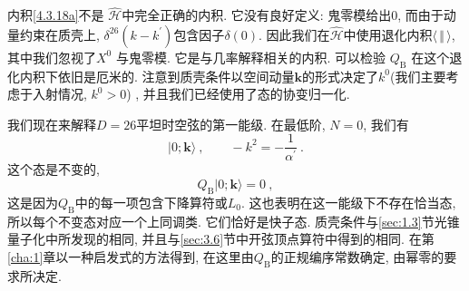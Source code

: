 内积\eqref{4.3.18a}不是 $\hat{\mathscr{H}}$中完全正确的内积. 它没有良好定义: 鬼零模给出0, 而由于动量约束在质壳上, $\delta^{26}(k-k^{\prime})$包含因子$\delta(0)$. 
因此我们在$\hat{\mathscr{H}}$中使用退化内积$\langle \,\Vert \,\rangle$, 其中我们忽视了$X^{0}$ 与鬼零模. 它是与几率解释相关的内积. 可以检验 $Q_{\mathrm{B}}$ 在这个退化内积下依旧是厄米的. 注意到质壳条件以空间动量$\mathbf{k}$的形式决定了$k^{0}$(我们主要考虑于入射情况, $k^{0}>0$) , 并且我们已经使用了态的协变归一化.

我们现在来解释$D=26$平坦时空弦的第一能级. 在最低阶, $N=0$, 我们有
\begin{equation}
|0 ; \mathbf{k}\rangle \:, \qquad-k^{2}=-\frac{1}{\alpha^{\prime}} \:. \label{4.3.23}
\end{equation}
这个态是不变的,
\begin{equation}
Q_{\mathrm{B}}|0 ; \mathbf{k}\rangle=0 \:, \label{4.3.24}
\end{equation}
这是因为$Q_{\mathrm{B}}$中的每一项包含下降算符或$L_{0}$. 这也表明在这一能级下不存在恰当态, 所以每个不变态对应一个上同调类. 它们恰好是快子态. 质壳条件与\ref{sec:1.3}节光锥量子化中所发现的相同, 并且与\ref{sec:3.6}节中开弦顶点算符中得到的相同. 在第\ref{cha:1}章以一种启发式的方法得到, 在这里由$Q_{\mathrm{B}}$的正规编序常数确定, 由幂零的要求所决定.

